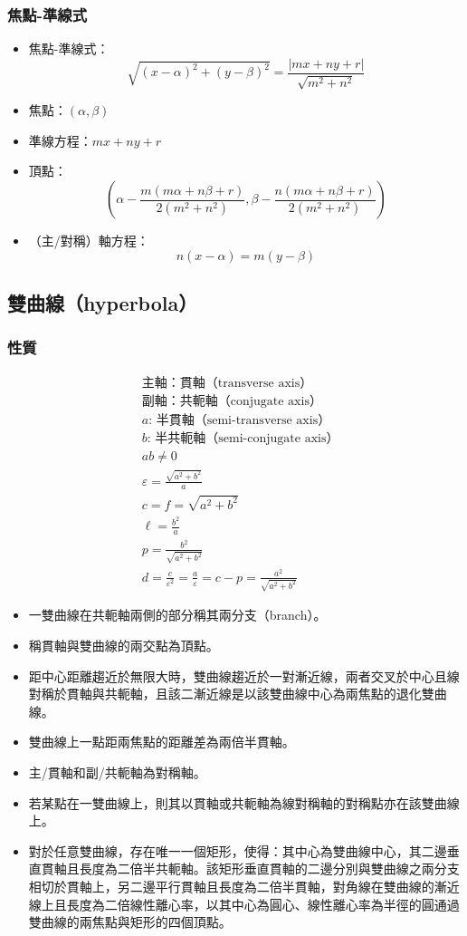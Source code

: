 \documentclass[a4paper,12pt]{article}
\begin{document}
\subsubsection{焦點-準線式}
\begin{itemize}
\item 焦點-準線式：
\[\sqrt{(x-\alpha)^2+(y-\beta)^2}=\frac{|mx+ny+r|}{\sqrt{m^2+n^2}}\]
\item 焦點：$(\alpha,\beta)$
\item 準線方程：$mx+ny+r$
\item 頂點：
\[\left( \alpha - \frac{m(m\alpha + n\beta + r)}{2(m^2+n^2)}, \beta - \frac{n(m\alpha + n\beta + r)}{2(m^2+n^2)} \right)\]
\item （主/對稱）軸方程：
\[n(x-\alpha)=m(y-\beta)\]
\end{itemize}
\subsection{雙曲線（hyperbola）}
\subsubsection{性質}
\[\begin{aligned}
&\text{主軸：貫軸（transverse axis）}\\
&\text{副軸：共軛軸（conjugate axis）}\\
&a:\,\text{半貫軸（semi-transverse axis）}\\
&b:\,\text{半共軛軸（semi-conjugate axis）}\\
&ab\neq 0\\
&\varepsilon=\frac{\sqrt{a^2+b^2}}{a}\\
&c=f=\sqrt{a^2+b^2}\\
&\ell=\frac{b^2}{a}\\
&p=\frac{b^2}{\sqrt{a^2+b^2}}\\
&d=\frac{c}{\varepsilon^2}=\frac{a}{\varepsilon}=c-p=\frac{a^2}{\sqrt{a^2+b^2}}
\end{aligned}\]
\begin{itemize}
\item 一雙曲線在共軛軸兩側的部分稱其兩分支（branch）。
\item 稱貫軸與雙曲線的兩交點為頂點。
\item 距中心距離趨近於無限大時，雙曲線趨近於一對漸近線，兩者交叉於中心且線對稱於貫軸與共軛軸，且該二漸近線是以該雙曲線中心為兩焦點的退化雙曲線。
\item 雙曲線上一點距兩焦點的距離差為兩倍半貫軸。
\item 主/貫軸和副/共軛軸為對稱軸。
\item 若某點在一雙曲線上，則其以貫軸或共軛軸為線對稱軸的對稱點亦在該雙曲線上。
\item 對於任意雙曲線，存在唯一一個矩形，使得：其中心為雙曲線中心，其二邊垂直貫軸且長度為二倍半共軛軸。該矩形垂直貫軸的二邊分別與雙曲線之兩分支相切於貫軸上，另二邊平行貫軸且長度為二倍半貫軸，對角線在雙曲線的漸近線上且長度為二倍線性離心率，以其中心為圓心、線性離心率為半徑的圓通過雙曲線的兩焦點與矩形的四個頂點。
\end{itemize}
\end{document}
